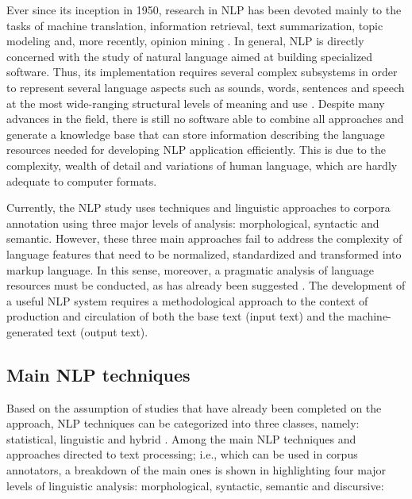 \documentclass[english]{textolivre}
\begin{document}
Ever since its inception in 1950, research in NLP has been devoted mainly to the tasks of machine translation, information retrieval, text summarization, topic modeling and, more recently, opinion mining \cite{cambria_jumping_2014}. In general, NLP is directly concerned with the study of natural language aimed at building specialized software. Thus, its implementation requires several complex subsystems in order to represent several language aspects such as sounds, words, sentences and speech at the most wide-ranging structural levels of meaning and use \cite{vieira_linguistica_2001}. Despite many advances in the field, there is still no software able to combine all approaches and generate a knowledge base that can store information describing the language resources needed for developing NLP application efficiently. This is due to the complexity, wealth of detail and variations of human language, which are hardly adequate to computer formats.

Currently, the NLP study uses techniques and linguistic approaches to corpora annotation using three major levels of analysis: morphological, syntactic and semantic. However, these three main approaches fail to address the complexity of language features that need to be normalized, standardized and transformed into markup language. In this sense, moreover, a pragmatic analysis of language resources must be conducted, as has already been suggested \cite{jones_probabilistic_2000}. The development of a useful NLP system requires a methodological approach to the context of production and circulation of both the base text (input text) and the machine-generated text (output text).

\subsection{Main NLP techniques}\label{sec-conduta}
Based on the assumption of studies that have already been completed on the approach, NLP techniques can be categorized into three classes, namely: statistical, linguistic and hybrid \cite{bharti_automatic_2017}. Among the main NLP techniques and approaches directed to text processing; i.e., which can be used in corpus annotators, a breakdown of the main ones is shown in  highlighting four major levels of linguistic analysis: morphological, syntactic, semantic and discursive:
\end{document}

